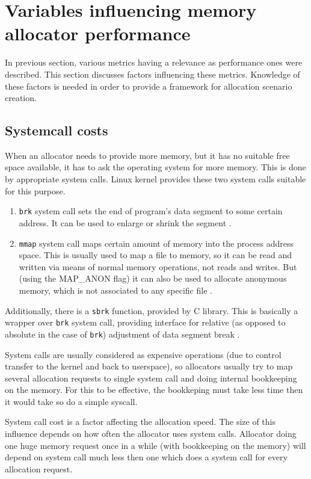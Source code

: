 \section{Variables influencing memory allocator performance}
\label{variables}

In previous section, various metrics having a relevance as performance ones were
described. This section discusses factors influencing these metrics. Knowledge of
these factors is needed in order to provide a framework for allocation scenario
creation.

\subsection{Systemcall costs}

When an allocator needs to provide more memory, but it has no suitable free space
available, it has to ask the operating system for more memory. This is done by
appropriate system calls. Linux kernel provides these two system calls suitable
for this purpose.

\begin{enumerate}
\item {\tt brk} system call sets the end of program's data segment to some
certain address. It can be used to enlarge or shrink the segment \cite{posix,
sbrk-manpage}. \item {\tt mmap} system call maps certain amount of memory into
the process address space. This is usually used to map a file to memory, so it
can be read and written via means of normal memory operations, not reads and
writes. But (using the MAP\_ANON flag) it can also be used to allocate anonymous
memory, which is not associated to any specific file \cite{posix, mmap-manpage}.
\end{enumerate}

Additionally, there is a {\tt sbrk} function, provided by C library. This is
basically a wrapper over {\tt brk} system call, providing interface for relative
(as opposed to absolute in the case of {\tt brk}) adjustment of data segment
break \cite{sbrk-manpage}.

System calls are usually considered as expensive operations (due to control
transfer to the kernel and back to userspace), so allocators usually try to map
several allocation requests to single system call and doing internal bookkeeping
on the memory. For this to be effective, the bookkeping must take less time then
it would take so do a simple syscall.

System call cost is a factor affecting the allocation speed. The size of this
influence depends on how often the allocator uses system calls. Allocator doing
one huge memory request once in a while (with bookkeeping on the memory) will
depend on system call much less then one which does a system call for every
allocation request.

